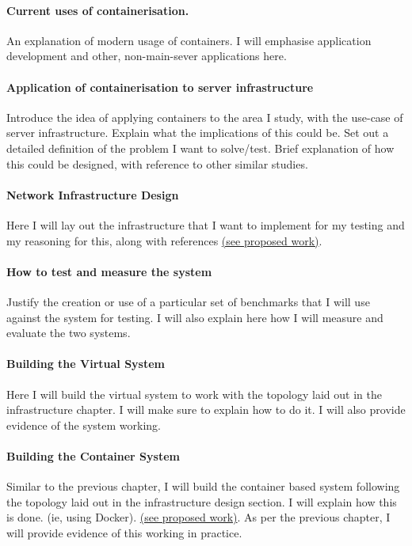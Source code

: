 \paragraph{Current uses of containerisation.} An explanation of modern usage of containers. I will emphasise application development and other, non-main-sever applications here.

\paragraph{Application of containerisation to server infrastructure} Introduce the idea of applying containers to the area I study, with the use-case of server infrastructure. Explain what the implications of this could be. Set out a detailed definition of the problem I want to solve/test. Brief explanation of how this could be designed, with reference to other similar studies.

\paragraph{Network Infrastructure Design} Here I will lay out the infrastructure that I want to implement for my testing and my reasoning for this, along with references \hyperref[proposed]{(see proposed work)}.

\paragraph{How to test and measure the system} Justify the creation or use of a particular set of benchmarks that I will use against the system for testing. I will also explain here how I will measure and evaluate the two systems.

\paragraph{Building the Virtual System} Here I will build the virtual system to work with the topology laid out in the infrastructure chapter. I will make sure to explain how to do it. I will also provide evidence of the system working.

\paragraph{Building the Container System} Similar to the previous chapter, I will build the container based system following the topology laid out in the infrastructure design section. I will explain how this is done. (ie, using Docker). \hyperref[proposed]{(see proposed work)}. As per the previous chapter, I will provide evidence of this working in practice.

